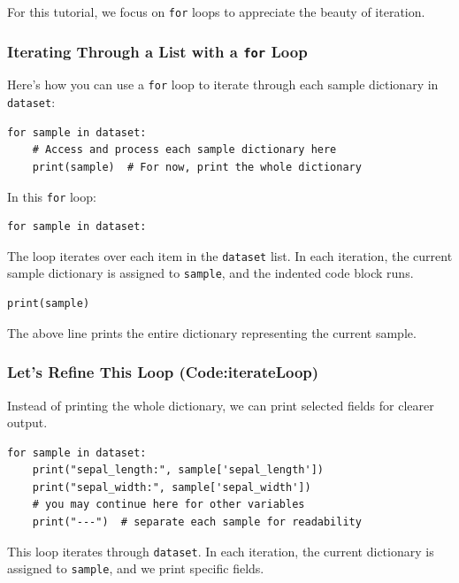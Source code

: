 For this tutorial, we focus on \texttt{for} loops to appreciate the beauty of iteration.

\subsubsection{Iterating Through a List with a \texttt{for} Loop}
\label{sec:iteratinglist}
Here's how you can use a \texttt{for} loop to iterate through each sample dictionary in \texttt{dataset}:

\begin{verbatim}
for sample in dataset:
    # Access and process each sample dictionary here
    print(sample)  # For now, print the whole dictionary
\end{verbatim}

In this \texttt{for} loop:

\begin{verbatim}
for sample in dataset:
\end{verbatim}

The loop iterates over each item in the \texttt{dataset} list. In each iteration, the current sample dictionary is assigned to \texttt{sample}, and the indented code block runs.

\begin{verbatim}
print(sample)
\end{verbatim}

The above line prints the entire dictionary representing the current sample.

\vspace{0.5cm}

\subsubsection{Let's Refine This Loop (Code:iterateLoop)}
\label{sec:refineloop}
Instead of printing the whole dictionary, we can print selected fields for clearer output.

\begin{verbatim}
for sample in dataset:
    print("sepal_length:", sample['sepal_length'])
    print("sepal_width:", sample['sepal_width'])
    # you may continue here for other variables
    print("---")  # separate each sample for readability
\end{verbatim}

This loop iterates through \texttt{dataset}. In each iteration, the current dictionary is assigned to \texttt{sample}, and we print specific fields.

